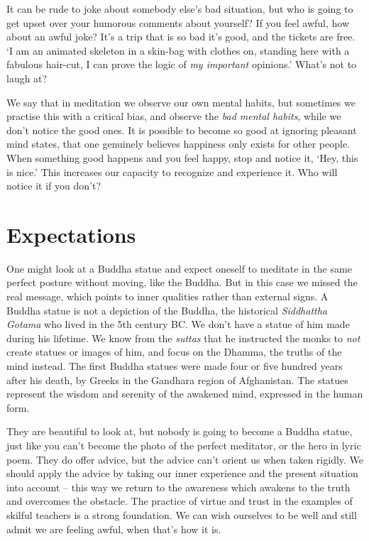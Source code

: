It can be rude to joke about somebody else's bad situation, but who is
going to get upset over your humorous comments about yourself? If you
feel awful, how about an awful joke? It's a trip that is so bad it's
good, and the tickets are free. `I am an animated skeleton in a skin-bag
with clothes on, standing here with a fabulous hair-cut, I can prove the
logic of \emph{my important} opinions.' What's not to laugh at?

We say that in meditation we observe our own mental habits, but
sometimes we practise this with a critical bias, and observe the
\emph{bad mental habits}, while we don't notice the good ones. It is
possible to become so good at ignoring pleasant mind states, that one
genuinely believes happiness only exists for other people. When
something good happens and you feel happy, stop and notice it, `Hey,
this is nice.' This increases our capacity to recognize and experience
it. Who will notice it if you don't?

\section{Expectations}


One might look at a Buddha statue and expect oneself to meditate in the
same perfect posture without moving, like the Buddha. But in this case
we missed the real message, which points to inner qualities rather than
external signs. A Buddha statue is not a depiction of the Buddha, the
historical \emph{Siddhattha Gotama} who lived in the 5th century BC. We
don't have a statue of him made during his lifetime. We know from the
\emph{suttas} that he instructed the monks to \emph{not} create statues
or images of him, and focus on the Dhamma, the truths of the mind
instead. The first Buddha statues were made four or five hundred years
after his death, by Greeks in the Gandhara region of Afghanistan. The
statues represent the wisdom and serenity of the awakened mind,
expressed in the human form.

They are beautiful to look at, but nobody is going to become a Buddha
statue, just like you can't become the photo of the perfect meditator,
or the hero in lyric poem. They do offer advice, but the advice can't
orient us when taken rigidly. We should apply the advice by taking our
inner experience and the present situation into account -- this way we
return to the awareness which awakens to the truth and overcomes the
obstacle. The practice of virtue and trust in the examples of skilful
teachers is a strong foundation. We can wish ourselves to be well and
still admit we are feeling awful, when that's how it is.

